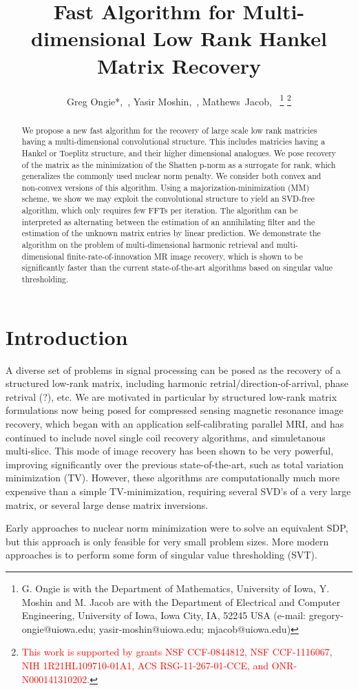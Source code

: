 \documentclass[10pt, twocolumn, twoside]{IEEEtran}
\title{Fast Algorithm for Multi-dimensional Low Rank Hankel Matrix Recovery}
\author{Greg Ongie*,~\IEEEmembership{Student Member,~IEEE}, Yasir Moshin,~\IEEEmembership{Student Member,~IEEE}, Mathews~Jacob,~\IEEEmembership{Senior Member,~IEEE}
\thanks{
G. Ongie is with the Department of Mathematics, University of Iowa, Y. Moshin and M. Jacob are with the Department of Electrical and Computer Engineering, University of Iowa, Iowa City, IA, 52245 USA (e-mail: gregory-ongie@uiowa.edu; yasir-moshin@uiowa.edu; mjacob@uiowa.edu)}
\thanks{\textcolor{red}{This work is supported by grants NSF CCF-0844812, NSF CCF-1116067,  NIH 1R21HL109710-01A1, ACS RSG-11-267-01-CCE, and ONR-N000141310202.}}}
\begin{document}
\maketitle

\begin{abstract}
We propose a new fast algorithm for the recovery of large scale low rank matricies having a multi-dimensional convolutional structure. This includes matricies having a Hankel or Toeplitz structure, and their higher dimensional analogues. We pose recovery of the matrix as the minimization of the Shatten p-norm as a surrogate for rank, which generalizes the commonly used nuclear norm penalty. We consider both convex and non-convex versions of this algorithm. Using a majorization-minimization (MM) scheme, we show we may exploit the convolutional structure to yield an SVD-free algorithm, which only requires few FFTs per iteration. The algorithm can be interpreted as alternating between the estimation of an annihilating filter and the estimation of the unknown matrix entries by linear prediction. We demonstrate the algorithm on the problem of multi-dimensional harmonic retrieval and multi-dimensional finite-rate-of-innovation MR image recovery, which is shown to be significantly faster than the current state-of-the-art algorithms based on singular value thresholding.
\end{abstract}

\section{Introduction}
\label{sec:intro}
A diverse set of problems in signal processing can be posed as the recovery of a structured low-rank matrix, including harmonic retrial/direction-of-arrival, phase retrival (?), etc. We are motivated in particular by structured low-rank matrix formulations now being posed for compressed sensing magnetic resonance image recovery, which began with an application self-calibrating parallel MRI, and has continued to include novel single coil recovery algorithms, and simuletanous multi-slice. This mode of image recovery has been shown to be very powerful, improving significantly over the previous state-of-the-art, such as total variation minimization (TV). However, these algorithms are computationally much more expensive than a simple TV-minimization, requiring several SVD's of a very large matrix, or several large dense matrix inversions.

Early approaches to nuclear norm minimization were to solve an equivalent SDP, but this approach is only feasible for very small problem sizes. More modern approaches is to perform some form of singular value thresholding (SVT). 
\end{document}
